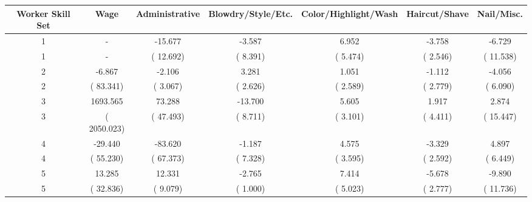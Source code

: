 
\centering
\begin{tabular}[t]{ccccccc}
\toprule
Worker Skill Set & Wage & Administrative & Blowdry/Style/Etc. & Color/Highlight/Wash & Haircut/Shave & Nail/Misc.\\
\midrule
1 & - & -15.677 & -3.587 & 6.952 & -3.758 & -6.729\\
1 & - & (   12.692) & (    8.391) & (    5.474) & (    2.546) & (   11.538)\\
2 & -6.867 & -2.106 & 3.281 & 1.051 & -1.112 & -4.056\\
2 & (   83.341) & (    3.067) & (    2.626) & (    2.589) & (    2.779) & (    6.090)\\
3 & 1693.565 & 73.288 & -13.700 & 5.605 & 1.917 & 2.874\\
3 & ( 2050.023) & (   47.493) & (    8.711) & (    3.101) & (    4.411) & (   15.447)\\
4 & -29.440 & -83.620 & -1.187 & 4.575 & -3.329 & 4.897\\
4 & (   55.230) & (   67.373) & (    7.328) & (    3.595) & (    2.592) & (    6.449)\\
5 & 13.285 & 12.331 & -2.765 & 7.414 & -5.678 & -9.890\\
5 & (   32.836) & (    9.079) & (    1.000) & (    5.023) & (    2.777) & (   11.736)\\
\bottomrule
\end{tabular}